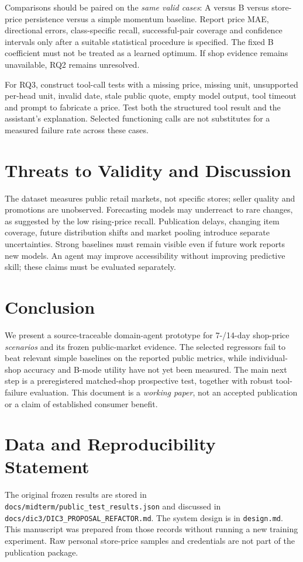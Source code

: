 \documentclass[11pt,a4paper]{article}
\begin{document}
Comparisons should be paired on the \emph{same valid cases}: A versus B versus store-price persistence versus a simple momentum baseline. Report price MAE, directional errors, class-specific recall, successful-pair coverage and confidence intervals only after a suitable statistical procedure is specified. The fixed B coefficient must not be treated as a learned optimum. If shop evidence remains unavailable, RQ2 remains unresolved.

For RQ3, construct tool-call tests with a missing price, missing unit, unsupported per-head unit, invalid date, stale public quote, empty model output, tool timeout and prompt to fabricate a price. Test both the structured tool result and the assistant's explanation. Selected functioning calls are not substitutes for a measured failure rate across these cases.

\section{Threats to Validity and Discussion}
The dataset measures public retail markets, not specific stores; seller quality and promotions are unobserved. Forecasting models may underreact to rare changes, as suggested by the low rising-price recall. Publication delays, changing item coverage, future distribution shifts and market pooling introduce separate uncertainties. Strong baselines must remain visible even if future work reports new models. An agent may improve accessibility without improving predictive skill; these claims must be evaluated separately.

\section{Conclusion}
We present a source-traceable domain-agent prototype for 7-/14-day shop-price \emph{scenarios} and its frozen public-market evidence. The selected regressors fail to beat relevant simple baselines on the reported public metrics, while individual-shop accuracy and B-mode utility have not yet been measured. The main next step is a preregistered matched-shop prospective test, together with robust tool-failure evaluation. This document is a \emph{working paper}, not an accepted publication or a claim of established consumer benefit.

\section*{Data and Reproducibility Statement}
The original frozen results are stored in \texttt{docs/midterm/public\_test\_results.json} and discussed in \texttt{docs/dic3/DIC3\_PROPOSAL\_REFACTOR.md}. The system design is in \texttt{design.md}. This manuscript was prepared from those records without running a new training experiment. Raw personal store-price samples and credentials are not part of the publication package.


\end{document}
